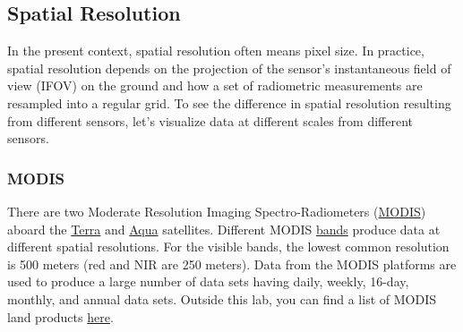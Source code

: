\documentclass[
]{article}
\begin{document}
\hypertarget{spatial-resolution}{%
\subsection{Spatial Resolution}\label{spatial-resolution}}

In the present context, spatial resolution often means pixel size. In practice, spatial resolution depends on the projection of the sensor's instantaneous field of view (IFOV) on the ground and how a set of radiometric measurements are resampled into a regular grid. To see the difference in spatial resolution resulting from different sensors, let's visualize data at different scales from different sensors.

\hypertarget{modis}{%
\subsubsection{MODIS}\label{modis}}

There are two Moderate Resolution Imaging Spectro-Radiometers (\href{http://modis.gsfc.nasa.gov/}{MODIS}) aboard the \href{http://terra.nasa.gov/}{Terra} and \href{http://aqua.nasa.gov/}{Aqua} satellites. Different MODIS \href{http://modis.gsfc.nasa.gov/about/specifications.php}{bands} produce data at different spatial resolutions. For the visible bands, the lowest common resolution is 500 meters (red and NIR are 250 meters). Data from the MODIS platforms are used to produce a large number of data sets having daily, weekly, 16-day, monthly, and annual data sets. Outside this lab, you can find a list of MODIS land products \href{https://lpdaac.usgs.gov/dataset_discovery/modis/modis_products_table}{here}.
\end{document}
